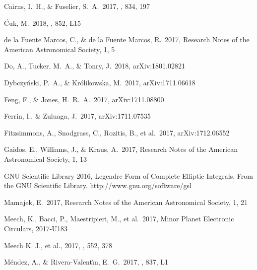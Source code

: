 \documentclass[a4paper,fleqn,usenatbib]{mnras}
\begin{document}
\begin{thebibliography}{99}

 Cairns, I.~H., \& Fuselier, S.~A.\ 2017, \apj, 834, 197

 {\'C}uk, M.\ 2018, \apjl, 852, L15

 de la Fuente Marcos, C., \& de la Fuente Marcos, R.\ 2017, Research Notes of the American Astronomical Society, 1, 5

 Do, A., Tucker, M.~A., \& Tonry, J.\ 2018, arXiv:1801.02821

 Dybczy{\'n}ski, P.~A., \& Kr{\'o}likowska, M.\ 2017, arXiv:1711.06618

 Feng, F., \& Jones, H.~R.~A.\ 2017, arXiv:1711.08800

 Ferrin, I., \& Zuluaga, J.\ 2017, arXiv:1711.07535

 Fitzsimmons, A., Snodgrass, C., Rozitis, B., et al.\ 2017, arXiv:1712.06552

 Gaidos, E., Williams, J., \& Kraus, A.\ 2017, Research Notes of the American Astronomical Society, 1, 13

 GNU Scientific Library 2016, Legendre Form of Complete Elliptic Integrals. From the GNU Scientific Library. http://www.gnu.org/software/gsl

 Mamajek, E.\ 2017, Research Notes of the American Astronomical Society, 1, 21 

 Meech, K., Bacci, P., Maestripieri, M., et al.\ 2017, Minor Planet Electronic Circulars, 2017-U183

 Meech K. J., et al., 2017, \nat, 552, 378

 M{\'e}ndez, A., \& Rivera-Valent{\'{\i}}n, E.~G.\ 2017, \apjl, 837, L1 


\end{thebibliography}
\end{document}
